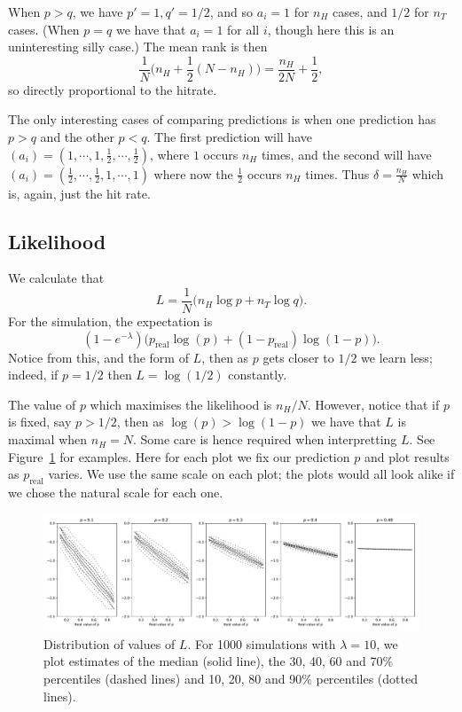 \documentclass[twoside,a4paper,twocolumn,10pt]{article}
\theoremstyle{plain}
\theoremstyle{definition}
\begin{document}
When $p>q$, we have $p'=1, q'=1/2$, and so $a_i = 1$ for $n_H$ cases, and $1/2$ for
$n_T$ cases.  (When $p=q$ we have that $a_i=1$ for all $i$, though here this is an
uninteresting silly case.)  The mean rank is then
\[ \frac{1}{N} \Big( n_H + \frac12 (N-n_H) \Big)
= \frac{n_H}{2N} + \frac12, \]
so directly proportional to the hitrate.

The only interesting cases of comparing predictions is when one prediction has
$p>q$ and the other $p<q$.  The first prediction will have
$(a_i) = (1,\cdots,1,\frac12,\cdots,\frac12)$, where $1$ occurs $n_H$ times,
and the second will have $(a_i) = (\frac12,\cdots,\frac12,1,\cdots,1)$ where
now the $\frac12$ occurs $n_H$ times.  Thus $\delta = \frac{n_H}{N}$ which
is, again, just the hit rate.



\subsection{Likelihood}

We calculate that
\[ L = \frac{1}{N} \big( n_H \log p + n_T \log q \big). \]
For the simulation, the expectation is
\[ (1-e^{-\lambda})\big( p_{\text{real}} \log(p)
+ (1-p_{\text{real}}) \log(1-p) \big). \]
Notice from this, and the form of $L$, then as $p$ gets closer to $1/2$
we learn less; indeed, if $p=1/2$ then $L = \log(1/2)$ constantly.

The value of $p$ which maximises the likelihood is $n_H/N$.  However,
notice that if $p$ is fixed, say $p>1/2$, then as $\log(p) > \log(1-p)$
we have that $L$ is maximal when $n_H = N$.  Some care is hence required
when interpretting $L$. See Figure~\ref{fig:li1} for examples.  Here
for each plot we fix our prediction $p$ and plot results as
$p_{\text{real}}$ varies.  We use the same scale on each plot; the plots
would all look alike if we chose the natural scale for each one.

\begin{figure}
  \includegraphics[width=\textwidth]{../details/likehood_toy.pdf}
  \caption{Distribution of values of $L$.  For 1000 simulations with
$\lambda=10$, we plot
estimates of the median (solid line), the 30, 40, 60 and 70\% percentiles
(dashed lines) and 10, 20, 80 and 90\% percentiles (dotted lines).}
  \label{fig:li1}
\end{figure}
\end{document}
